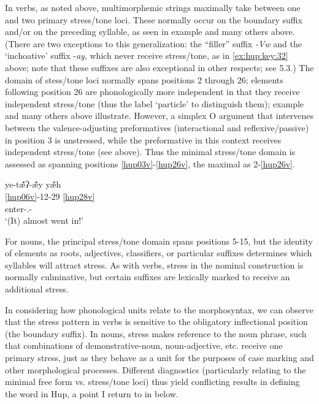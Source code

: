 \documentclass[output=paper]{langscibook}
\begin{document}
In verbs, as noted above, multimorphemic strings maximally take between one and two primary stress/tone loci. These normally occur on the boundary suffix and/or on the preceding syllable, as seen in example  and many others above. (There are two exceptions to this generalization: the ``filler'' suffix \textit{{}-Vw} and the `inchoative' suffix -\textit{ay}, which never receive stress/tone, as in \ref{ex:hup:key:32} above; note that these suffixes are also exceptional in other respects; see 5.3.) The domain of stess/tone loci normally spans positions 2 through 26; elements following position 26 are phonologically more independent in that they receive independent stress/tone (thus the label `particle' to distinguish them); example  and many others above illustrate. However, a simplex O argument that intervenes between the valence-adjusting preformatives (interactional and reflexive/passive) in position 3 is unstressed, while the preformative in this context receives independent stress/tone (see  above). Thus the minimal stress/tone domain is assessed as spanning positions \ref{hup03v}-\ref{hup26v}, the maximal as 2-\ref{hup26v}.

\ea\label{ex:hup:key:34} 
\glll ye-tæ̃́ʔ-æ̃́y yæ̃́h\\ 
\ref{hup06v}-12-29 \ref{hup28v}\\ 
enter-\Cntr.\Fact-\Dynm{} \Frust{}\\ 
\glt `(It) almost went in!'
\z 

For nouns, the principal stress/tone domain spans positions 5-15, but the identity of elements as roots, adjectives, classifiers, or particular suffixes determines which syllables will attract stress. As with verbs, stress in the nominal construction is normally culminative, but certain suffixes are lexically marked to receive an additional stress. 

In considering how phonological units relate to the morphosyntax, we can observe that the stress pattern in verbs is sensitive to the obligatory inflectional position (the boundary suffix). In nouns, stress makes reference to the noun phrase, such that combinations of demonstrative-noun, noun-adjective, etc. receive one primary stress, just as they behave as a unit for the purposes of case marking and other morphological processes. Different diagnostics (particularly relating to the minimal free form vs. stress/tone loci) thus yield conflicting results in defining the word in Hup, a point I return to in  below.
\end{document}
